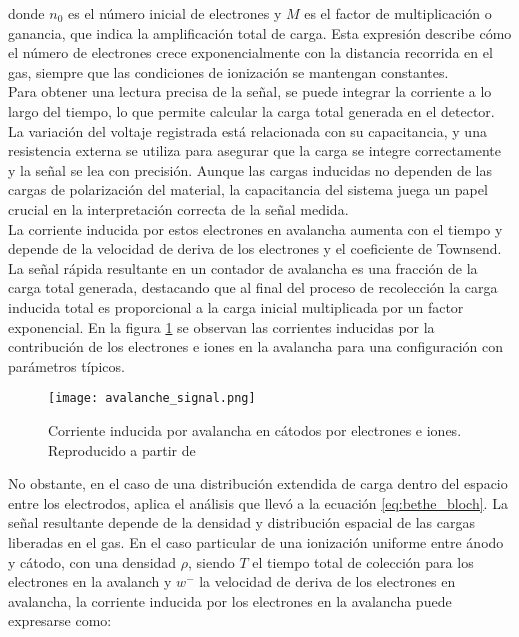 \documentclass{report}
\begin{document}
\noindent donde \(n_0\) es el número inicial de electrones y \(M\) es el factor de multiplicación o ganancia, que indica la amplificación total de carga. Esta expresión describe cómo el número de electrones crece exponencialmente con la distancia recorrida en el gas, siempre que las condiciones de ionización se mantengan constantes.\\

\noindent Para obtener una lectura precisa de la señal, se puede integrar la corriente a lo largo del tiempo, lo que permite calcular la carga total generada en el detector. La variación del voltaje registrada está relacionada con su capacitancia, y una resistencia externa se utiliza para asegurar que la carga se integre correctamente y la señal se lea con precisión. Aunque las cargas inducidas no dependen de las cargas de polarización del material, la capacitancia del sistema juega un papel crucial en la interpretación correcta de la señal medida.\\

\noindent La corriente inducida por estos electrones en avalancha aumenta con el tiempo y depende de la velocidad de deriva de los electrones y el coeficiente de Townsend. La señal rápida resultante en un contador de avalancha es una fracción de la carga total generada, destacando que al final del proceso de recolección la carga inducida total es proporcional a la carga inicial multiplicada por un factor exponencial. En la figura \ref{fig:avalanche_signal} se observan las corrientes inducidas por la contribución de los electrones e iones en la avalancha para una configuración con parámetros típicos.

\begin{figure}[H]
    \centering
    \texttt{[image: avalanche\_signal.png]}
    \caption{Corriente inducida por avalancha en cátodos por electrones e iones. Reproducido a partir de \cite{sauli2015gaseous3}}
    \label{fig:avalanche_signal}
\end{figure}

\noindent No obstante, en el caso de una distribución extendida de carga dentro del espacio entre los electrodos, aplica el análisis que llevó a la ecuación \ref{eq:bethe_bloch}. La señal resultante depende de la densidad y distribución espacial de las cargas liberadas en el gas. En el caso particular de una ionización uniforme entre ánodo y cátodo, con una densidad \( \rho \), siendo $T$ el tiempo total de colección para los electrones en la avalanch y $w^-$ la velocidad de deriva de los electrones en avalancha, la corriente inducida por los electrones en la avalancha puede expresarse como:
\end{document}
